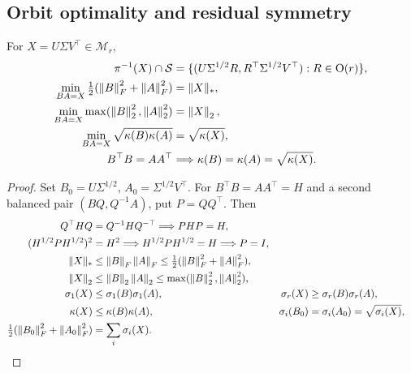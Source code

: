 \subsection{Orbit optimality and residual symmetry}
\begin{theorem}
\label{thm:balanced-optimal}
For $X=U\Sigma V^\top\in\mathcal M_r$,
\begin{align}
\pi^{-1}(X)\cap\mathcal S
&=\{(U\Sigma^{1/2}R,R^\top\Sigma^{1/2}V^\top):R\in{\rm O}(r)\},\\
\min_{BA=X}\tfrac12(\left\lVert B\right\rVert_F^2+\left\lVert A\right\rVert_F^2)&=\|X\|_*,\\
\min_{BA=X}\max(\left\lVert B\right\rVert_2^2,\left\lVert A\right\rVert_2^2)&=\left\lVert X\right\rVert_2,\\
\min_{BA=X}\sqrt{\kappa(B)\kappa(A)}&=\sqrt{\kappa(X)},\\
B^\top B=AA^\top&\Longrightarrow
\kappa(B)=\kappa(A)=\sqrt{\kappa(X)}.
\label{eq:rigid-balance-opt}
\end{align}
\end{theorem}
\begin{proof}
Set $B_0=U\Sigma^{1/2}$, $A_0=\Sigma^{1/2}V^\top$.
For $B^\top B=AA^\top=H$ and a second balanced pair
$(BQ,Q^{-1}A)$, put $P=QQ^\top$. Then
\begin{align}
Q^\top HQ&=Q^{-1}HQ^{-\top}\Longrightarrow PHP=H,\\
(H^{1/2}PH^{1/2})^2&=H^2
\Longrightarrow H^{1/2}PH^{1/2}=H
\Longrightarrow P=I,\\
\|X\|_*&\leq\left\lVert B\right\rVert_F\left\lVert A\right\rVert_F\leq\tfrac12(\left\lVert B\right\rVert_F^2+\left\lVert A\right\rVert_F^2),\\
\left\lVert X\right\rVert_2&\leq\left\lVert B\right\rVert_2\left\lVert A\right\rVert_2\leq\max(\left\lVert B\right\rVert_2^2,\left\lVert A\right\rVert_2^2),\\
\sigma_1(X)&\leq\sigma_1(B)\sigma_1(A),&
\sigma_r(X)&\geq\sigma_r(B)\sigma_r(A),\\
\kappa(X)&\leq\kappa(B)\kappa(A),&
\sigma_i(B_0)&=\sigma_i(A_0)=\sqrt{\sigma_i(X)},\\
\tfrac12(\left\lVert B_0\right\rVert_F^2+\left\lVert A_0\right\rVert_F^2)&=\sum_i\sigma_i(X).
\end{align}
\end{proof}

